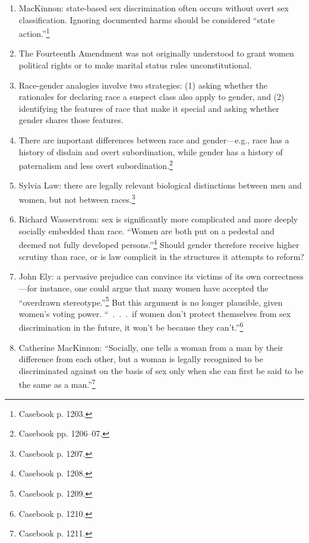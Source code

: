 \begin{enumerate}
    \item MacKinnon: state-based sex discrimination often occurs without overt 
    sex classification. Ignoring documented harms should be considered ``state 
    action.''\footnote{Casebook p. 1203.}
    \item The Fourteenth Amendment was not originally understood to grant 
    women political rights or to make marital status rules 
    unconstitutional.
    \item Race-gender analogies involve two strategies: (1) asking whether the 
    rationales for declaring race a suspect class also apply to gender, and 
    (2) identifying the features of race that make it special and asking 
    whether gender shares those features.
    \item There are important differences between race and gender---e.g., race 
    has a history of disdain and overt subordination, while gender has a 
    history of paternalism and less overt subordination.\footnote{Casebook pp. 
    1206--07.}
    \item Sylvia Law: there are legally relevant biological distinctions 
    between men and women, but not between races.\footnote{Casebook p. 1207.}
    \item Richard Wasserstrom: sex is significantly more complicated and more 
    deeply socially embedded than race. ``Women are both put on a pedestal and 
    deemed not fully developed persons.''\footnote{Casebook p. 1208.} Should 
    gender therefore receive higher scrutiny than race, or is law complicit in 
    the structures it attempts to reform?
    \item John Ely: a pervasive prejudice can convince its victims of its own 
    correctness---for instance, one could argue that many women have accepted 
    the ``overdrawn stereotype.''\footnote{Casebook p. 1209.} But this 
    argument is no longer plausible, given women's voting power. ``~.~.~.~if 
    women don't protect themselves from sex discrimination in the future, it 
    won't be because they can't.''\footnote{Casebook p. 1210.}
    \item Catherine MacKinnon: ``Socially, one tells a woman from a man by 
    their difference from each other, but a woman is legally recognized to be 
    discriminated against on the basis of sex only when she can first be said 
    to be the same as a man.''\footnote{Casebook p. 1211.}
\end{enumerate}
 
